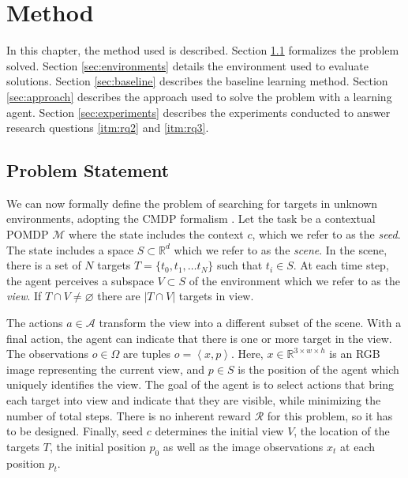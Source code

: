 \chapter{Method}
\label{cha:method}

In this chapter, the method used is described.
Section \ref{sec:problem} formalizes the problem solved.
Section \ref{sec:environments} details the environment used to evaluate solutions.
Section \ref{sec:baseline} describes the baseline learning method.
Section \ref{sec:approach} describes the approach used to solve the problem with a learning agent.
Section \ref{sec:experiments} describes the experiments conducted to answer research questions \ref{itm:rq2} and \ref{itm:rq3}.

\section{Problem Statement}
\label{sec:problem}

We can now formally define the problem of searching for targets in unknown environments,
adopting the CMDP formalism \cite{kirk_survey_2022}.
Let the task be a contextual POMDP \(\mathcal{M}\) where the state includes the context \(c\), which we refer to as the \textit{seed}.
The state includes a space \(S \subset \mathbb{R}^d\) which we refer to as the \textit{scene}.
In the scene, there is a set of \(N\) targets \(T = \{t_0, t_1, \dots t_N\}\) such that \(t_i \in S\).
At each time step, the agent perceives a subspace \(V \subset S\) of the environment which we refer to as the \textit{view}.
If \(T \cap V \neq \varnothing\) there are \(\left\lvert T \cap V \right\rvert\) targets in view.

The actions \(a \in \mathcal{A}\) transform the view into a different subset of the scene.
With a final action, the agent can indicate that there is one or more target in the view.
The observations \(o \in \Omega\) are tuples \(o = \left\langle x, p \right\rangle\).
Here, \(x \in \mathbb{R}^{3 \times w \times h}\) is an RGB image representing the current view, and \(p \in S\) is the position of the agent which uniquely identifies the view.
The goal of the agent is to select actions that bring each target into view and indicate that they are visible, while minimizing the number of total steps.
There is no inherent reward \(\mathcal{R}\) for this problem, so it has to be designed.
Finally, seed \(c\) determines the initial view \(V\), the location of the targets \(T\), the initial position \(p_0\) as well as the image observations \(x_t\) at each position \(p_t\).

